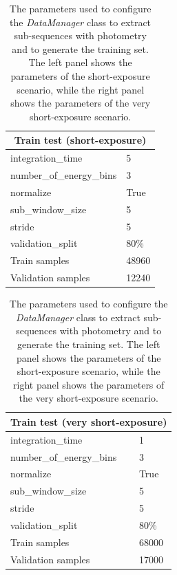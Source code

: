 \begin{table}[]
\centering
\begin{tabular}{|l|l|}
\hline
\multicolumn{2}{|c|}{\textbf{Train test (short-exposure)}} \\
\hline
integration\_time  & 5 \\ 
number\_of\_energy\_bins & 3 \\ 
normalize & True \\ 
sub\_window\_size & 5 \\ 
stride & 5 \\ 
validation\_split & 80\% \\ 
Train samples & 48960 \\ 
Validation samples & 12240 \\ \hline
\end{tabular}
\quad
\begin{tabular}{|l|l|}
\hline
\multicolumn{2}{|c|}{\textbf{Train test (very short-exposure)}} \\
\hline
integration\_time  & 1 \\ 
number\_of\_energy\_bins & 3 \\ 
normalize & True \\ 
sub\_window\_size & 5 \\ 
stride & 5 \\ 
validation\_split & 80\% \\
Train samples & 68000 \\ 
Validation samples & 17000 \\ \hline
\end{tabular}
\caption{The parameters used to configure the \textit{DataManager} class to extract sub-sequences with photometry and to generate the training set. The left panel shows the parameters of the short-exposure scenario, while the right panel shows the parameters of the very short-exposure scenario.}
\label{tab:training-set-ts}
\end{table}


